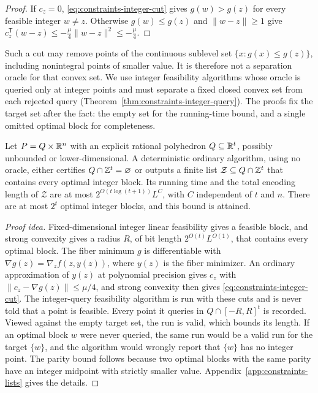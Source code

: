 \begin{proof}
If $c_z=0$, \eqref{eq:constraints-integer-cut} gives $g(w)>g(z)$ for every
feasible integer $w\ne z$. Otherwise $g(w)\le g(z)$ and $\|w-z\|\ge1$ give
$c_z^{\mathsf T}(w-z)\le-\frac\mu4\|w-z\|^2\le-\frac\mu4$.
\end{proof}

Such a cut may remove points of the continuous sublevel set
$\{x:g(x)\le g(z)\}$, including nonintegral points of smaller value. It is
therefore not a separation oracle for that convex set. We use integer
feasibility algorithms whose oracle is queried only at integer points and
must separate a fixed closed convex set from each rejected query
(Theorem~\ref{thm:constraints-integer-query}). The proofs fix the target set
after the fact: the empty set for the running-time bound, and a single
omitted optimal block for completeness.

\begin{theorem}
\label{thm:constraints-candidates}
Let $P=Q\times\mathbb R^n$ with an explicit rational polyhedron $Q\subseteq\mathbb R^t$,
possibly unbounded or lower-dimensional. A deterministic ordinary algorithm,
using no oracle, either certifies $Q\cap\mathbb Z^t=\varnothing$ or outputs a finite
list $\mathcal Z\subseteq Q\cap\mathbb Z^t$ that contains every optimal integer
block. Its running time and the total encoding length of $\mathcal Z$ are at
most $2^{O(t\log(t+1))}L^{C}$, with $C$ independent of $t$ and $n$. There are
at most $2^t$ optimal integer blocks, and this bound is attained.
\end{theorem}

\begin{proof}[Proof idea]
Fixed-dimensional integer linear feasibility gives a feasible block, and
strong convexity gives a radius $R$, of bit length $2^{O(t)}L^{O(1)}$, that
contains every optimal block. The fiber minimum $g$ is differentiable with
$\nabla g(z)=\nabla_zf(z,y(z))$, where $y(z)$ is the fiber minimizer. An
ordinary approximation of $y(z)$ at polynomial precision gives $c_z$ with
$\|c_z-\nabla g(z)\|\le\mu/4$, and strong convexity then gives
\eqref{eq:constraints-integer-cut}. The integer-query feasibility algorithm is
run with these cuts and is never told that a point is feasible. Every point it
queries in $Q\cap[-R,R]^t$ is recorded. Viewed against the empty target set,
the run is valid, which bounds its length. If an optimal block $w$ were never
queried, the same run would be a valid run for the target $\{w\}$, and the
algorithm would wrongly report that $\{w\}$ has no integer point. The parity
bound follows because two optimal blocks with the same parity have an integer
midpoint with strictly smaller value. Appendix~\ref{app:constraints-lists}
gives the details.
\end{proof}

